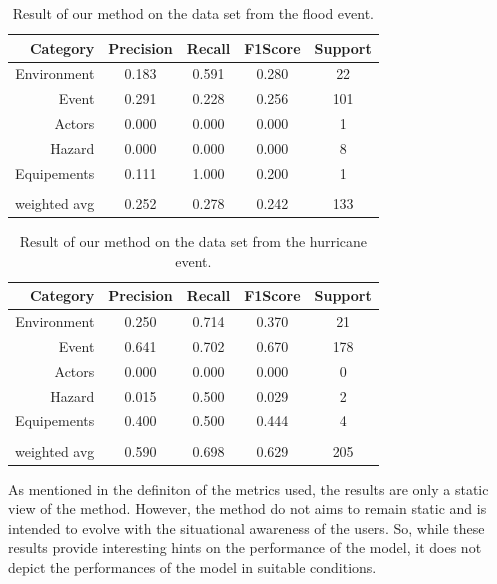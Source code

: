 \begin{table}[bp]
    \centering
    \caption{Result of our method on the data set from the flood event.}
    \begin{tabular}{rcccc}
        Category     & Precision & Recall & F1\-Score & Support \\
        \toprule
        Environment  & 0.183     & 0.591  & 0.280     & 22      \\
        Event        & 0.291     & 0.228  & 0.256     & 101     \\
        Actors       & 0.000     & 0.000  & 0.000     & 1       \\
        Hazard       & 0.000     & 0.000  & 0.000     & 8       \\
        Equipements  & 0.111     & 1.000  & 0.200     & 1       \\
                     &           &        &           &         \\
        weighted avg & 0.252     & 0.278  & 0.242     & 133     \\
        \bottomrule
    \end{tabular}
    \label{table:flood-results}
\end{table}

\begin{table}[bp]
    \centering
    \caption{Result of our method on the data set from the hurricane event.}
    \begin{tabular}{rcccc}
        Category     & Precision & Recall & F1\-Score & Support \\
        \toprule
        Environment  & 0.250     & 0.714  & 0.370     & 21      \\
        Event        & 0.641     & 0.702  & 0.670     & 178     \\
        Actors       & 0.000     & 0.000  & 0.000     & 0       \\
        Hazard       & 0.015     & 0.500  & 0.029     & 2       \\
        Equipements  & 0.400     & 0.500  & 0.444     & 4       \\
                     &           &        &           &         \\
        weighted avg & 0.590     & 0.698  & 0.629     & 205     \\
        \bottomrule
    \end{tabular}
    \label{table:hurricane-results}
\end{table}

As mentioned in the definiton of the metrics used, the results are only a static view of
the method.
However, the method do not aims to remain static and is intended to evolve with the situational
awareness of the users.
So, while these results provide interesting hints on the performance of the model, it
does not depict the performances of the model in suitable conditions.

